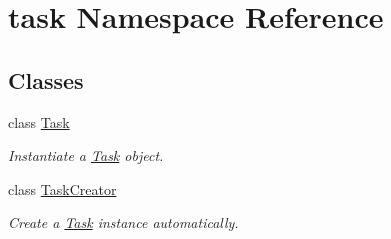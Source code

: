 \hypertarget{namespacetask}{
\section{task \-Namespace \-Reference}
\label{namespacetask}
}
\subsection*{\-Classes}
\begin{DoxyCompactItemize}
\item 
class \hyperlink{classtask_1_1Task}{\-Task}
\begin{DoxyCompactList}\small\item\em \-Instantiate a \hyperlink{classtask_1_1Task}{\-Task} object. \end{DoxyCompactList}\item 
class \hyperlink{classtask_1_1TaskCreator}{\-Task\-Creator}
\begin{DoxyCompactList}\small\item\em \-Create a \hyperlink{classtask_1_1Task}{\-Task} instance automatically. \end{DoxyCompactList}\end{DoxyCompactItemize}
